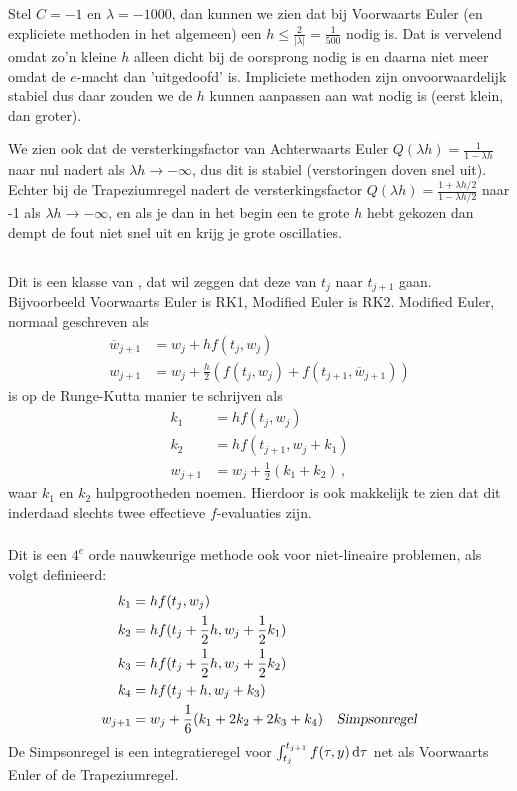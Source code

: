 \documentclass{2wn20summary}
\begin{document}
		\begin{voorbeeld}
			Stel $C=-1$ en $\lambda = -1000$, dan kunnen we zien dat bij Voorwaarts Euler (en expliciete methoden in het algemeen) een $h\le \frac{2}{|\lambda|} = \frac{1}{500}$ nodig is. Dat is vervelend omdat zo'n kleine $h$ alleen dicht bij de oorsprong nodig is en daarna niet meer omdat de $e$-macht dan 'uitgedoofd' is. Impliciete methoden zijn onvoorwaardelijk stabiel dus daar zouden we de $h$ kunnen aanpassen aan wat nodig is (eerst klein, dan groter).
		\end{voorbeeld}
		
			We zien ook dat de versterkingsfactor van Achterwaarts Euler $Q(\lambda h)=\frac{1}{1-\lambda h}$ naar nul nadert als $\lambda h \to - \infty$, dus dit is stabiel (verstoringen doven snel uit). Echter bij de Trapeziumregel nadert de versterkingsfactor $Q(\lambda h)=\frac{1+\lambda h/2}{1-\lambda h/2}$ naar -1 als $\lambda h \to - \infty$, en als je dan in het begin een te grote $h$ hebt gekozen dan dempt de fout niet snel uit en krijg je grote oscillaties.
			
		\subsection{} 
			Dit is een klasse van , dat wil zeggen dat deze van $t_j$ naar $t_{j+1}$ gaan. Bijvoorbeeld Voorwaarts Euler is RK1, Modified Euler is RK2. Modified Euler, normaal geschreven als
			\begin{align*}
				\overline w_{j+1} &= w_j + h f(t_j,w_j) \\
				w_{j+1} &= w_j + \frac{h}{2} (f(t_j,w_j) + f(t_{j+1},\overline w_{j+1}))
			\end{align*}
			is op de Runge-Kutta manier te schrijven als
			\begin{align*}
				k_1 &= hf(t_j,w_j) \\
				k_2 &= hf(t_{j+1},w_j + k_1) \\
				w_{j+1} &= w_j + \frac{1}{2}(k_1 + k_2) \,,
			\end{align*}
			waar $k_1$ en $k_2$ hulpgrootheden noemen. Hierdoor is ook makkelijk te zien dat dit inderdaad slechts twee effectieve $f$-evaluaties zijn.
			
		\subsubsection{}
			Dit is een $4^e$ orde nauwkeurige methode ook voor niet-lineaire problemen, als volgt definieerd:
			\begin{align*}
				k_1 &= hf(t_j,w_j) \\
				k_2 &= h f(t_j+\frac{1}{2} h,w_j + \frac{1}{2}k_1) \\
				k_3 &= hf (t_j+\frac{1}{2}h,w_j + \frac{1}{2}k_2) \\
				k_4 &= hf(t_j + h,w_j + k_3) \\
				w_{j+1} &= w_j + \frac{1}{6} (k_1 + 2k_2 + 2k_3 + k_4)\quad \text {\indx{Simpsonregel}}
			\end{align*}
			De Simpsonregel is een integratieregel voor $\int_{t_j}^{t_{j+1}} f(\tau,y) \mathop{}\!\mathrm{d} \tau$ net als Voorwaarts Euler of de Trapeziumregel.
			
\end{document}
